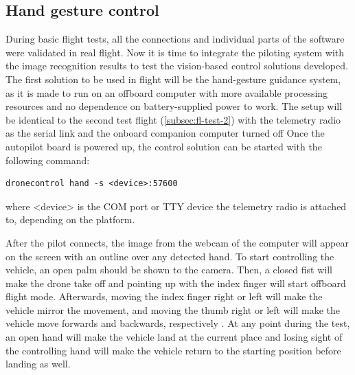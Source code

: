 \subsection{Hand gesture control}
\label{subsec:fl-test-4}


During basic flight tests, all the connections and individual parts of the software were validated in real flight.
Now it is time to integrate the piloting system with the image recognition results to test the vision-based control solutions developed.
The first solution to be used in flight will be the hand-gesture guidance system, as it is made to run on an offboard computer with more available processing resources and no dependence on battery-supplied power to work.
The setup will be identical to the second test flight (\ref{subsec:fl-test-2}) with the telemetry radio as the serial link and the onboard companion computer turned off
Once the autopilot board is powered up, the control solution can be started with the following command:
\begin{verbatim}
dronecontrol hand -s <device>:57600
\end{verbatim}
where <device> is the COM port or TTY device the telemetry radio is attached to, depending on the platform.


After the pilot connects, the image from the webcam of the computer will appear on the screen with an outline over any detected hand.
To start controlling the vehicle, an open palm should be shown to the camera.
Then, a closed fist will make the drone take off and pointing up with the index finger will start offboard flight mode.
Afterwards, moving the index finger right or left will make the vehicle mirror the movement, 
and moving the thumb right or left will make the vehicle move forwards and backwards, respectively .
At any point during the test, an open hand will make the vehicle land at the current place and losing sight of the controlling hand will make the vehicle return to the starting position before landing as well.


